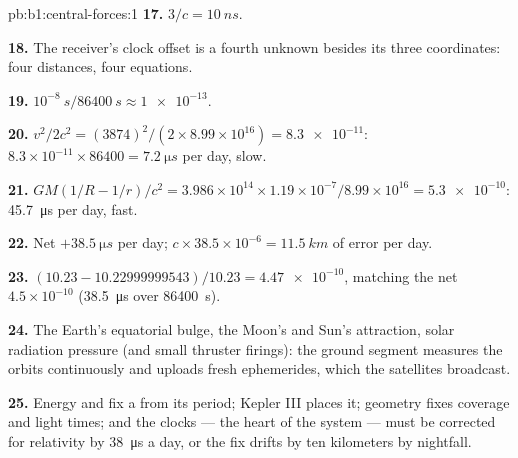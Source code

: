 \begin{solution}{pb:b1:central-forces:1}
\textbf{17.} $3/c = \qty{10}{ns}$.

\textbf{18.} The receiver's clock offset is a fourth unknown besides its
three coordinates: four distances, four equations.

\textbf{19.} $10^{-8}\ \unit{s}/\qty{86400}{s} \approx \num{1e-13}$.

\textbf{20.} $v^2/2c^2 = (3874)^2/(2 \times 8.99\times10^{16}) = \num{8.3e-11}$:
$8.3\times10^{-11} \times 86400 = \qty{7.2}{\micro s}$ per day, slow.

\textbf{21.} $GM(1/R - 1/r)/c^2 = 3.986\times10^{14} \times 1.19\times10^{-7}/
8.99\times10^{16} = \num{5.3e-10}$: \qty{45.7}{\micro s} per day, fast.

\textbf{22.} Net $+\qty{38.5}{\micro s}$ per day; $c \times 38.5\times10^{-6}
= \qty{11.5}{km}$ of error per day.

\textbf{23.} $(10.23 - 10.22999999543)/10.23 = \num{4.47e-10}$, matching
the net $4.5\times10^{-10}$ (\qty{38.5}{\micro s} over \qty{86400}{s}).

\textbf{24.} The Earth's equatorial bulge, the Moon's and Sun's
attraction, solar radiation pressure (and small thruster firings): the
ground segment measures the orbits continuously and uploads fresh
ephemerides, which the satellites broadcast.

\textbf{25.} Energy and  fix a  from its
period; Kepler III places it; geometry fixes coverage and light times;
and the clocks --- the heart of the system --- must be corrected for
relativity by \qty{38}{\micro s} a day, or the fix drifts by ten
kilometers by nightfall.
\end{solution}
